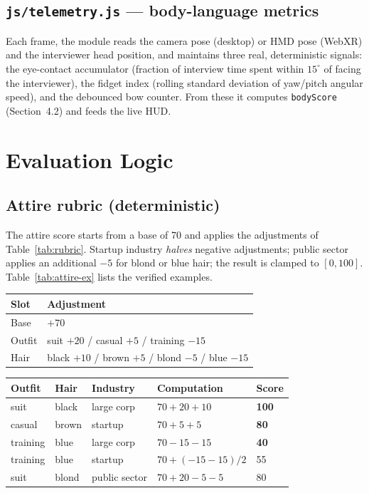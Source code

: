 \documentclass[10pt,a4paper]{article}
\begin{document}
\subsection{\texttt{js/telemetry.js} --- body-language metrics}
Each frame, the module reads the camera pose (desktop) or HMD pose (WebXR) and the interviewer head position, and maintains three real, deterministic signals: the eye-contact accumulator (fraction of interview time spent within $15^\circ$ of facing the interviewer), the fidget index (rolling standard deviation of yaw/pitch angular speed), and the debounced bow counter. From these it computes \texttt{bodyScore} (Section~4.2) and feeds the live HUD.

\section{Evaluation Logic}
\subsection{Attire rubric (deterministic)}
The attire score starts from a base of 70 and applies the adjustments of Table~\ref{tab:rubric}. Startup industry \emph{halves} negative adjustments; public sector applies an additional $-5$ for blond or blue hair; the result is clamped to $[0,100]$. Table~\ref{tab:attire-ex} lists the verified examples.

\begin{center}\small
\begin{tabular}{@{}ll@{}}
\toprule
Slot & Adjustment \\
\midrule
Base & $+70$ \\
Outfit & suit $+20$ \;/\; casual $+5$ \;/\; training $-15$ \\
Hair & black $+10$ \;/\; brown $+5$ \;/\; blond $-5$ \;/\; blue $-15$ \\
\bottomrule
\end{tabular}
\label{tab:rubric}
\end{center}

\begin{center}\small
\begin{tabular}{@{}lllll@{}}
\toprule
Outfit & Hair & Industry & Computation & Score \\
\midrule
suit & black & large corp & $70+20+10$ & \textbf{100} \\
casual & brown & startup & $70+5+5$ & \textbf{80} \\
training & blue & large corp & $70-15-15$ & \textbf{40} \\
training & blue & startup & $70+(-15-15)/2$ & 55 \\
suit & blond & public sector & $70+20-5-5$ & 80 \\
\bottomrule
\end{tabular}
\label{tab:attire-ex}
\end{center}
\end{document}
